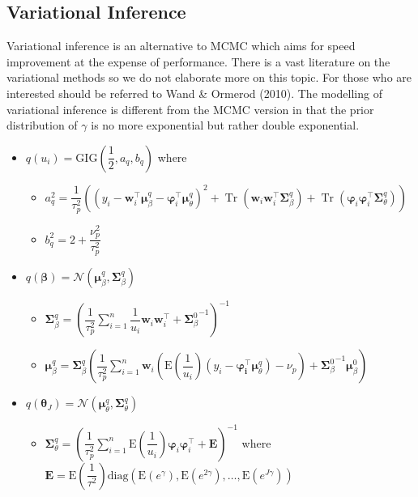 \documentclass[12pt]{article}
\newcommand{\bs}{\boldsymbol}
\DeclareMathOperator{\Tr}{Tr}
\begin{document}
\subsection{Variational Inference}
  Variational inference is an alternative to MCMC which aims for speed improvement at the expense of performance. There is a vast literature on the variational methods so we do not elaborate more on this topic. For those who are interested should be referred to Wand \& Ormerod (2010). The modelling of variational inference is different from the MCMC version in that the prior distribution of $\gamma$ is no more exponential but rather double exponential. 
\begin{itemize}
  \item $q\left(u_{i}\right) = \mathrm{GIG}\left(\dfrac{1}{2}, a_{q}, b_{q}\right)$ where
  \begin{itemize}
    \item $a_{q}^{2}= \dfrac{1}{\tau_{p}^{2}}\left(\left(y_{i}-\bs{w}_{i}^{\top}\bs{\mu}_{\beta}^{q}-\bs{\varphi}_{i}^{\top}\bs{\mu}_{\theta}^{q}\right)^{2}+\Tr\left(\bs{w}_{i}\bs{w}_{i}^{\top}\bs{\Sigma}_{\beta}^{q}\right)+\Tr\left(\bs{\varphi}_{i}\bs{\varphi}_{i}^{\top}\bs{\Sigma}_{\theta}^{q}\right) \right) $
    \item $b_{q}^{2}=2 + \dfrac{\nu_{p}^{2}}{\tau_{p}^{2}}$
  \end{itemize}
  \item $q\left(\bs{\beta}\right)=\mathcal{N}\left(\bs{\mu}_{\beta}^{q},\bs{\Sigma}_{\beta}^{q}\right)$
  \begin{itemize}
    \item $\bs{\Sigma}_{\beta}^{q}= \left(\dfrac{1}{\tau_{p}^{2}}\displaystyle \sum_{i=1}^{n}\dfrac{1}{u_{i}}\bs{w}_{i}\bs{w}_{i}^{\top}+{\bs{\Sigma}_{\beta}^{0}}^{-1}\right)^{-1} $
    \item $\bs{\mu}_{\beta}^{q} = \bs{\Sigma}_{\beta}^{q}\left(\dfrac{1}{\tau_{p}^{2}}\displaystyle \sum_{i=1}^{n}\bs{w}_{i}\left(\mathrm{E}\left(\dfrac{1}{u_{i}}\right)\left(y_{i}-\bs{\varphi_{i}^{\top}}\bs{\mu}_{\theta}^{q}\right)-\nu_{p}\right)+{\bs{\Sigma}_{\beta}^{0}}^{-1}\bs{\mu}_{\beta}^{0} \right) $
  \end{itemize}
  \item $q\left(\bs{\theta}_{J}\right)=\mathcal{N}\left(\bs{\mu}_{\theta}^{q},\bs{\Sigma}_{\theta}^{q}\right)$
  \begin{itemize}
    \item $\bs{\Sigma}_{\theta}^{q}=\left(\dfrac{1}{\tau_{p}^{2}}\displaystyle \sum_{i=1}^{n}\mathrm{E}\left(\dfrac{1}{u_{i}}\right)\bs{\varphi}_{i}\bs{\varphi}_{i}^{\top}+\bs{E} \right)^{-1}$ where $\bs{E}=\mathrm{E}\left(\dfrac{1}{\tau^{2}}\right)\mathrm{diag}\left(\mathrm{E}\left(e^{\gamma}\right), \mathrm{E}\left(e^{2\gamma}\right),\ldots, \mathrm{E}\left(e^{J\gamma}\right) \right) $

\end{itemize}
\end{itemize}
\end{document}
